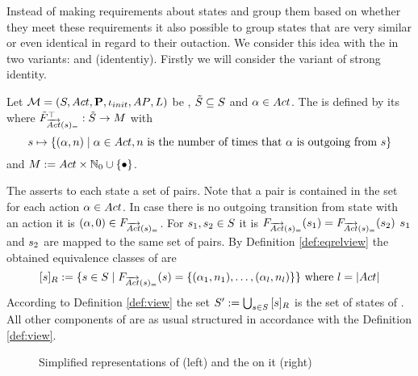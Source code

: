 \documentclass[preview]{standalone}
\begin{document}

Instead of making requirements about states and group them based on whether they meet these requirements it also possible to group states that are very similar or even identical in regard to their outaction. We consider this idea with the \emph{\outactident \viewNC} in two variants: \outactidentstrong and \outactidentweak (idententiy). Firstly we will consider the variant of strong identity.

\begin{definition}
	Let ${{{\mathcal{M}}}} = {{({S}, {Act}, {\textbf{P}}, {\iota_{init}}, {AP}, {L})}}$ be \achgphN, ${\tilde{{S}}} \subseteq {S}$ and ${\alpha} \in {Act}$. The \viewN \viewstrongoutactident is defined by its \grpfctN \gfctstrongoutactident where ${{\tilde{F}_{{{\overrightarrow{{Act}}}({s})_=}}}^{\top}} : {\tilde{{S}}} \to {\ensuremath{{M}}}$ with
	\[
	\state \mapsto	
	\{(\action, \numoutact) \mid \action \in \actions, \numoutact \text{ is the number of times that \action is outgoing from } \state\}
	\]
	and $\imggrp := \actions \times \natnums_0 \cup \remset$.
\end{definition}

The \grpfctN asserts to each state a set of pairs. Note that a pair is contained in the set for each action ${\alpha} \in {Act}$. In case there is no outgoing transition from state \state with an action \action it is $({\alpha}, 0) \in {\ensuremath{{F_{{{\overrightarrow{{Act}}}({s})_=}}}}}$. For ${s}_1, {s}_2 \in {S}$ it is ${{F_{{{\overrightarrow{{Act}}}({s})_=}}}}({s}_1) = {{F_{{{\overrightarrow{{Act}}}({s})_=}}}}({s}_2)$ \iffN ${s}_1$ and ${s}_2$ are mapped to the same set of pairs. By Definition \ref{def:eqrelview} the obtained equivalence classes of \eqrelview are
\[
	{{[{s}]_{{R}}}} := \{{s} \in {S} \mid {\ensuremath{{F_{{{\overrightarrow{{Act}}}({s})_=}}}}}({s}) = \{({\alpha}_1, {n}_1), \dots, ({\alpha}_l, {n}_l)\}\} \text{  where } l = |{Act}|
\]
According to Definition \ref{def:view} the set ${S}' := \bigcup_{{s} \in {S}} {{[{s}]_{{R}}}}$ is the set of states of \viewstrongoutactident. All other components of \viewstrongoutactident are as usual structured in accordance with the Definition \ref{def:view}.

\begin{figure}[h]
	\begin{minipage}{.5\textwidth}
		\hspace{5mm}
		
	\end{minipage}%
	\begin{minipage}{.5\textwidth}		
		\hspace{5mm}
		
	\end{minipage}
	
	\caption{Simplified representations of \mdp (left) and the \viewN \viewstrongoutactident on it (right)}
	\label{fig:outActIdentStrongAfter}

\end{figure}
\end{document}
